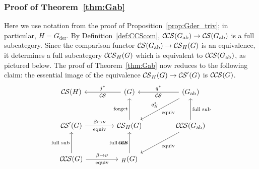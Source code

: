 \documentclass[10pt]{amsart}
\theoremstyle{plain}
\theoremstyle{definition}
\newcommand{\der}{_{\operatorname{der}}}
\newcommand{\ab}{_{\operatorname{ab}}}
\newcommand{\CS}{{\mathcal{C\hskip-0.8pt S}}}
\newcommand{\CCS}{{\mathcal{C\hskip-.8pt C\hskip-0.8pt S}}}
\begin{document}
\subsubsection{Proof of Theorem~\ref{thm:Gab}}\label{ssec:proof2}

Here we use notation from the proof of Proposition~\ref{prop:Gder_triv};
in particular, $H = G\der$.
By Definition~\ref{def:CCScom}, $\CCS(G\ab) \to \CS(G\ab)$ is a full subcategory.
Since the comparison functor $\CS(G\ab) \to \CS_{H}(G)$ is an equivalence, it determines a full subcategory $\CCS_{H}(G)$ which is equivalent to $\CCS(G\ab)$, as pictured below.
The proof of Theorem~\ref{thm:Gab} now reduces to the following claim: the essential image of the equivalence $\CS_{H}(G) \to \CS'(G)$ is $\CCS(G)$.
\[
\begin{tikzcd}[row sep=30, column sep=40]
\CS(H) 
& \arrow{l}[swap]{j^*} \CS(G) 
&\arrow{l}[swap]{q^*} 
\CS(G\ab) \arrow{dl}{\text{equiv}}[swap]{q_{H}^*} \\
\CS'(G)  \arrow{r}{\beta \mapsto \nu}[swap]{\text{equiv}} 
&  \CS_{H}(G) \arrow{u}{\text{forget}}  
&  %
\CCS(G\ab) \arrow{u}[swap]{\text{full sub}} \arrow{dl}{\text{equiv}} \\
\CCS(G) \arrow{u}{\text{full sub}} \arrow{r}{\beta \mapsto \nu}[swap]{\text{equiv}}
& \arrow{u}{\text{full sub}}  \CCS_{H}(G) 
& 
\end{tikzcd}
\]
\end{document}
